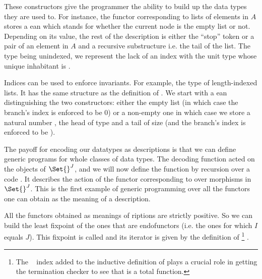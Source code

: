 These constructors give the programmer the ability to build up the data
types they are used to. For instance, the functor corresponding
to lists of elements in $A$ stores a ean which stands for whether
the current node is the empty list or not. Depending on its value, the
rest of the description is either the ``stop'' token or a pair of an element
in $A$ and a recursive substructure i.e. the tail of the list. The  type
being unindexed, we represent the lack of an index with the unit type \AD{$\top$}
whose unique inhabitant is .

\begin{center}
\end{center}

Indices can be used to enforce invariants. For example, the type {  }
of length-indexed lists. It has the same structure as the definition of .
We start with a ean distinguishing the two constructors: either
the empty list (in which case the branch's index is enforced to be $0$) or a
non-empty one in which case we store a natural number , the head of type
 and a tail of size  (and the branch's index is enforced to be
 ).

\begin{center}
\end{center}

The payoff for encoding our datatypes as descriptions is that we can define
generic programs for whole classes of data types. The decoding function 
acted on the objects of $\Set{}^J$, and we will now define the function  by
recursion over a code . It describes the action of the functor corresponding
to  over morphisms in $\Set{}^J$. This is the first example of generic
programming over all the functors one can obtain as the meaning of a description.

\begin{center}
\end{center}

All the functors obtained as meanings of riptions are strictly
positive. So we can build the least fixpoint of the ones that are endofunctors
(i.e. the ones for which $I$ equals $J$). This fixpoint is called 
and its iterator is given by the definition of  %
\footnote{The ~\cite{DBLP:journals/corr/abs-1012-4896} index added
to the inductive definition of  plays a crucial role in getting the
termination checker to see that  is a total function.
}
.

